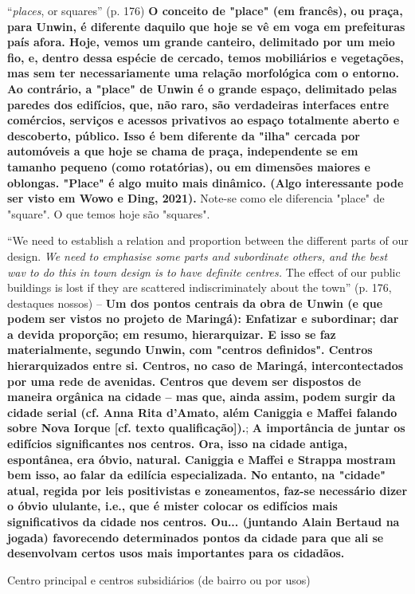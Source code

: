 \documentclass[12pt, a4paper]{book} %
\begin{document}
        ``\textit{places}, or squares'' (p. 176) \textbf{O conceito de "place" (em francês), ou praça, para Unwin, é diferente daquilo que hoje se vê em voga em prefeituras país afora. Hoje, vemos um grande canteiro, delimitado por um meio fio, e, dentro dessa espécie de cercado, temos mobiliários e vegetações, mas sem ter necessariamente uma relação morfológica com o entorno. Ao contrário, a "place" de Unwin é o grande espaço, delimitado pelas paredes dos edifícios, que, não raro, são verdadeiras interfaces entre comércios, serviços e acessos privativos ao espaço totalmente aberto e descoberto, público. Isso é bem diferente da "ilha" cercada por automóveis a que hoje se chama de praça, independente se em tamanho pequeno (como rotatórias), ou em dimensões maiores e oblongas. "Place" é algo muito mais dinâmico. (Algo interessante pode ser visto em Wowo e Ding, 2021).} Note-se como ele diferencia "place" de "square". O que temos hoje são "squares".

        ``We need to establish a relation and proportion between the different parts of our design. \textit{We need to emphasise some parts and subordinate others, and the best wav to do this in town design is to have definite centres.} The effect of our public buildings is lost if they are scattered indiscriminately about the town'' (p. 176, destaques nossos) – \textbf{Um dos pontos centrais da obra de Unwin (e que podem ser vistos no projeto de Maringá): Enfatizar e subordinar; dar a devida proporção; em resumo, hierarquizar. E isso se faz materialmente, segundo Unwin, com "centros definidos". Centros hierarquizados entre si. Centros, no caso de Maringá, intercontectados por uma rede de avenidas. Centros que devem ser dispostos de maneira orgânica na cidade – mas que, ainda assim, podem surgir da cidade serial (cf. Anna Rita d'Amato, além Caniggia e Maffei falando sobre Nova Iorque [cf. texto qualificação]).}; \textbf{A importância de juntar os edifícios significantes nos centros. Ora, isso na cidade antiga, espontânea, era óbvio, natural. Caniggia e Maffei e Strappa mostram bem isso, ao falar da edilícia especializada. No entanto, na "cidade" atual, regida por leis positivistas e zoneamentos, faz-se necessário dizer o óbvio ululante, i.e., que é mister colocar os edifícios mais significativos da cidade nos centros. Ou... (juntando Alain Bertaud na jogada) favorecendo determinados pontos da cidade para que ali se desenvolvam certos usos mais importantes para os cidadãos.}

        Centro principal e centros subsidiários (de bairro ou por usos)
\end{document}
